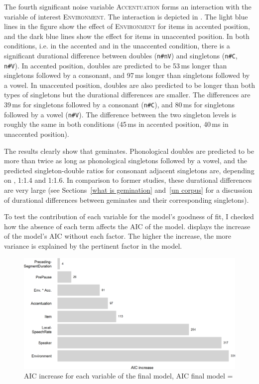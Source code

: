 The fourth significant noise variable \textsc{Accentuation} forms an interaction with the variable of interest \textsc{Environment}. The interaction is depicted in .
The light blue lines in the figure show the effect of \textsc{Environment} for items in accented position, and the dark blue lines show the effect for items in unaccented position. In both conditions, i.e. in the accented and in the unaccented condition, there is a significant durational difference between doubles (\texttt{n\#nV}) and singletons (\texttt{n\#C}, \texttt{n\#V}). 
 In accented position, doubles are predicted to be 53\,ms longer than singletons followed by a consonant, and 97\,ms longer than singletons followed by a vowel. 
 In unaccented position, doubles are also predicted to be longer than both types of singletons but the durational differences are smaller. The differences are 39\,ms  for singletons followed by a consonant (\texttt{n\#C}), and 80\,ms for singletons followed by a vowel (\texttt{n\#V}). The difference between the two singleton levels is roughly the same in both conditions (45\,ms in accented position, 40\,ms in unaccented position).


The results clearly show that  geminates. Phonological doubles are predicted to be more than twice as long as phonological singletons followed by a vowel, and the predicted singleton-double ratios for consonant adjacent singletons are, depending on , 1:1.4 and 1:1.6. In comparison to former studies, these durational differences are very large (see Sections~\ref{what is gemination} and~\ref{un corpus} for a discussion of durational differences between geminates and their corresponding singletons). 

To test the contribution of each variable for the model's goodness of fit, I checked how the absence of each term affects the AIC of the model.  displays the increase of the model's AIC  without each factor. The higher the increase, the more variance is explained by the pertinent factor in the model.\largerpage[-2]

\begin{figure}
	\includegraphics[scale=0.7] {images/Experiment/AICdecreaseUnComplex.png}
	\caption{AIC increase for each variable of the final model, AIC final model = \label{fig:Effect sozed un Exp unV vs Unn}}
\end{figure}

